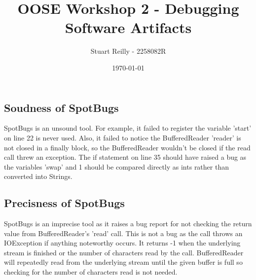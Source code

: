 \documentclass[11pt]{article}
\begin{document}
    \author{Stuart Reilly - 2258082R}
    \date{\today}
    \title{OOSE Workshop 2 - Debugging Software Artifacts}
    \maketitle

    \subsection*{Soudness of SpotBugs}
    SpotBugs is an unsound tool.
    For example, it failed to register the variable 'start' on line 22 is never used.
    Also, it failed to notice the BufferedReader 'reader' is not closed in a finally block, so the BufferedReader wouldn't be closed if the read call threw an exception.
    The if statement on line 35 should have raised a bug as the variables 'swap' and 1 should be compared directly as ints rather than converted into Strings.

    \subsection*{Precisness of SpotBugs}
    SpotBugs is an imprecise tool as it raises a bug report for not checking the return value from BufferedReader's 'read' call.
    This is not a bug as the call throws an IOException if anything noteworthy occurs.
    It returns -1 when the underlying stream is finished or the number of characters read by the call.
    BufferedReader will repeatedly read from the underlying stream until the given buffer is full so checking for the number of characters read is not needed.
\end{document}
